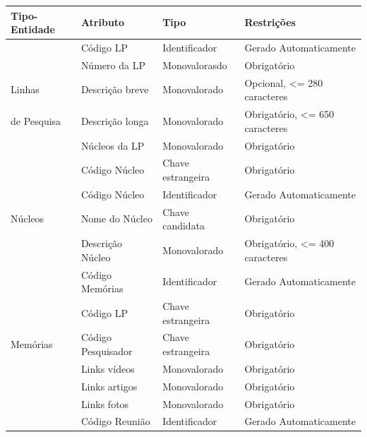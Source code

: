 \documentclass[11pt]{../../classes/ifscarticle}
\begin{document}
\begin{table}[h]
    \centering
    \vspace{0.5cm}
    \begin{tabular}{ |p{}|p{3cm}|p{4cm}|p{}|  }
      \hline
      Tipo-Entidade & Atributo & Tipo & Restrições \\ %
     
                                             
      \hline
                    & Código LP       & Identificador     & Gerado Automaticamente         \\
                    & Número da LP    & Monovalorasdo      & Obrigatório                    \\
     Linhas        & Descrição breve & Monovalorado      & Opcional, <= 280 caracteres    \\
     de Pesquisa    & Descrição longa & Monovalorado      & Obrigatório, <= 650 caracteres \\
                    & Núcleos da LP   & Monovalorado      & Obrigatório                    \\
                    & Código Núcleo   & Chave estrangeira & Obrigatório                    \\
      \hline
                    & Código Núcleo       & Identificador     & Gerado Automaticamente         \\
      Núcleos       & Nome do Núcleo      & Chave candidata   & Obrigatório                    \\
                    & Descrição Núcleo & Monovalorado      & Obrigatório, <= 400 caracteres \\
      \hline
                    & Código Memórias     & Identificador     & Gerado Automaticamente \\
                    & Código LP           & Chave estrangeira & Obrigatório            \\
      Memórias      & Código \linebreak Pesquisador  & Chave estrangeira & Obrigatório            \\
                    & Links vídeos        & Monovalorado      & Obrigatório            \\
                    & Links artigos       & Monovalorado      & Obrigatório            \\
                    & Links fotos         & Monovalorado      & Obrigatório            \\
      \hline 
                    & Código Reunião      & Identificador     & Gerado Automaticamente  \\

\end{tabular}
\end{table}
\end{document}

